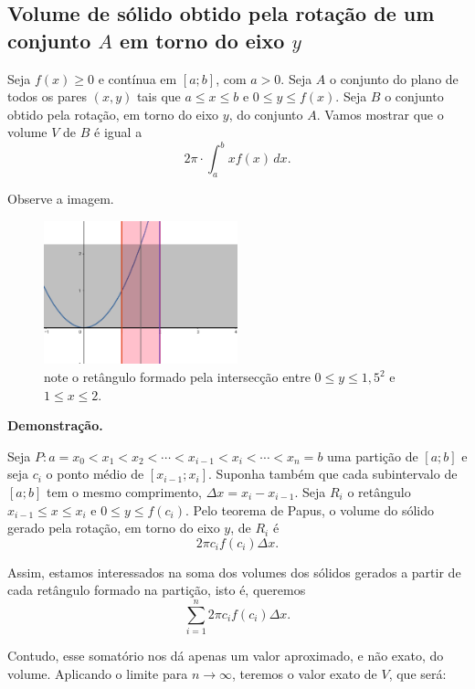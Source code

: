 \documentclass{article}
\begin{document}
{\begin{newpage}
\subsection{Volume de sólido obtido pela rotação de um conjunto $A$ em torno do eixo $y$}
\hspace{12pt} Seja $f(x)\geq 0$ e contínua em $[a;b]$, com $a>0$. Seja $A$ o conjunto do plano de todos os pares $(x,y)$ tais que $\displaystyle{a\leq x\leq b}$ e $\displaystyle{0\leq y\leq f(x)}$. Seja $B$ o conjunto obtido pela rotação, em torno do eixo $y$, do conjunto $A$. Vamos mostrar que o volume $V$ de $B$ é igual a
$$\displaystyle{2\pi\cdot\int_{a}^{b}xf(x)\, dx.}$$
\par Observe a imagem.
\begin{figure}[htbp]
\begin{center}
\includegraphics[width=0.5\textwidth, angle=0]{Grafico20.png}
\end{center}
\caption{note o retângulo formado pela intersecção entre $\displaystyle{0\leq y\leq 1,5^{2}}$ e $\displaystyle{1\leq x\leq 2}$.}
\end{figure}
\par
\textbf{Demonstração.}
\par
Seja $\displaystyle{P:a = x_0 < x_1 < x_2 < \cdots < x_{i-1} < x_i < \cdots < x_n = b}$ uma partição de $[a;b]$ e seja $c_i$ o ponto médio de $[x_{i-1};x_i]$. Suponha também que cada subintervalo de $[a;b]$ tem o mesmo comprimento, $\displaystyle{\Delta x = x_i - x_{i-1}}$. Seja $R_i$ o retângulo $\displaystyle{x_{i-1}\leq x\leq x_i}$ e $\displaystyle{0\leq y\leq f(c_i)}$. Pelo teorema de Papus, o volume do sólido gerado pela rotação, em torno do eixo $y$, de $R_i$ é
$$\displaystyle{2\pi c_{i}f(c_i)\Delta x}.$$
\par Assim, estamos interessados na soma dos volumes dos sólidos gerados a partir de cada retângulo formado na partição, isto é, queremos
$$\displaystyle{\sum_{i=1}^{n} 2\pi c_{i}f(c_i)\Delta x}.$$    
\par Contudo, esse somatório nos dá apenas um valor aproximado, e não exato, do volume. Aplicando o limite para $n\rightarrow \infty $, teremos o valor exato de $V$, que será:

\end{newpage}}
\end{document}
